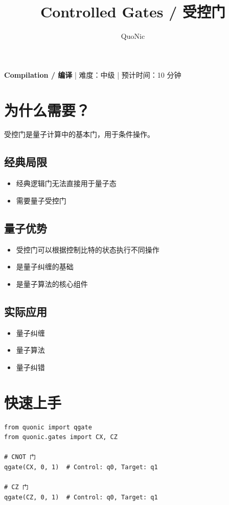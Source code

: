\documentclass[12pt,a4paper]{article}
\title{Controlled Gates / 受控门}
\author{QuoNic}
\date{}
\begin{document}
\maketitle

\begin{center}
\textbf{Compilation / 编译} | 难度：中级 | 预计时间：10 分钟
\end{center}

\tableofcontents
\newpage

\section{为什么需要？}

受控门是量子计算中的基本门，用于条件操作。

\subsection{经典局限}
\begin{itemize}
  \item 经典逻辑门无法直接用于量子态
  \item 需要量子受控门
\end{itemize}

\subsection{量子优势}
\begin{itemize}
  \item 受控门可以根据控制比特的状态执行不同操作
  \item 是量子纠缠的基础
  \item 是量子算法的核心组件
\end{itemize}

\subsection{实际应用}
\begin{itemize}
  \item 量子纠缠
  \item 量子算法
  \item 量子纠错
\end{itemize}

\section{快速上手}

\begin{verbatim}
from quonic import qgate
from quonic.gates import CX, CZ

# CNOT 门
qgate(CX, 0, 1)  # Control: q0, Target: q1

# CZ 门
qgate(CZ, 0, 1)  # Control: q0, Target: q1
\end{verbatim}
\end{document}
